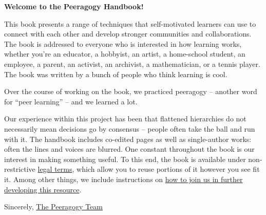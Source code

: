 \noindent\textbf{Welcome to the Peeragogy Handbook!}

\bigskip

This book presents a range of techniques that self-motivated learners
can use to connect with each other and develop stronger communities and
collaborations. The book is addressed to everyone who is interested in
how learning works, whether you're an educator, a hobbyist, an artist, a
home-school student, an employee, a parent, an activist, an archivist, a
mathematician, or a tennis player. The book was written by a bunch of
people who think learning is cool.

Over the course of working on the book, we practiced peeragogy --
another word for ``peer learning'' -- and we learned a lot.

Our experience within this project has been that flattened hierarchies
do not necessarily mean decisions go by consensus -- people often take
the ball and run with it. The handbook includes co-edited pages as well
as single-author works: often the lines and voices are blurred. One
constant throughout the book is our interest in making something useful.
To this end, the book is available under non-restrictive
\href{http://peeragogy.org/resources/license/}{legal terms}, which allow
you to reuse portions of it however you see fit it. Among other things,
we include instructions on
\href{http://peeragogy.org/resources/how-to-get-involved/}{how to join
us in further developing this resource}.

\bigskip

Sincerely, \href{http://peeragogy.org/resources/meet-the-team/}{The
Peeragogy Team}
